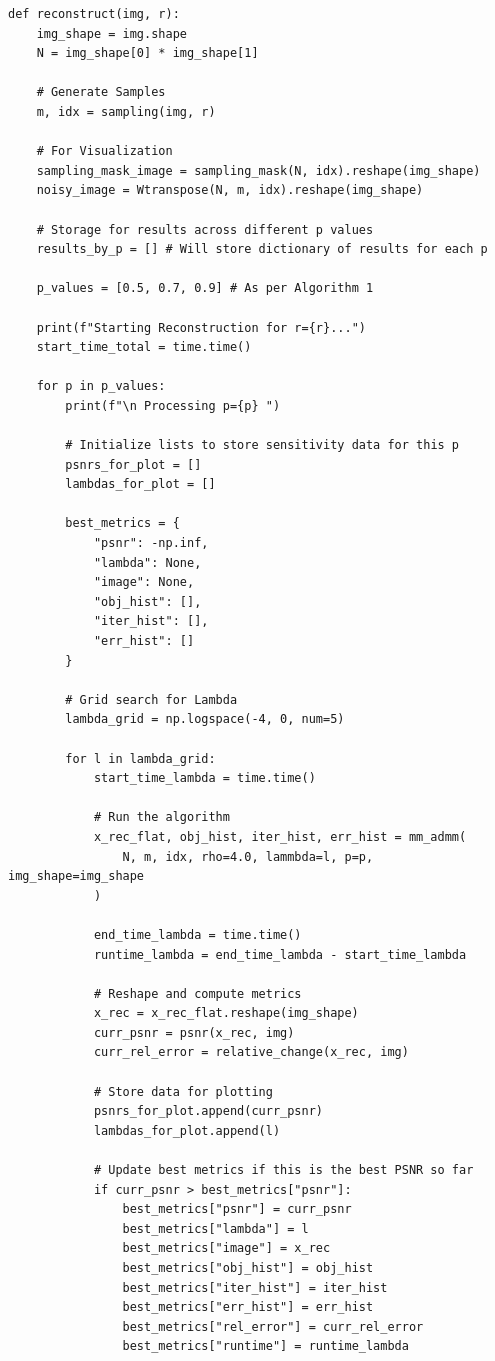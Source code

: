 \documentclass[12pt,a4paper,onecolumn]{exam}
\begin{document}
\begin{lstlisting}
def reconstruct(img, r):
    img_shape = img.shape
    N = img_shape[0] * img_shape[1] 
    
    # Generate Samples
    m, idx = sampling(img, r) 
    
    # For Visualization
    sampling_mask_image = sampling_mask(N, idx).reshape(img_shape)
    noisy_image = Wtranspose(N, m, idx).reshape(img_shape)

    # Storage for results across different p values
    results_by_p = [] # Will store dictionary of results for each p
    
    p_values = [0.5, 0.7, 0.9] # As per Algorithm 1
    
    print(f"Starting Reconstruction for r={r}...")
    start_time_total = time.time()
    
    for p in p_values:
        print(f"\n Processing p={p} ")
        
        # Initialize lists to store sensitivity data for this p
        psnrs_for_plot = []
        lambdas_for_plot = []
        
        best_metrics = {
            "psnr": -np.inf,
            "lambda": None,
            "image": None,
            "obj_hist": [],
            "iter_hist": [],
            "err_hist": []
        }
        
        # Grid search for Lambda
        lambda_grid = np.logspace(-4, 0, num=5) 
        
        for l in lambda_grid:
            start_time_lambda = time.time()
            
            # Run the algorithm
            x_rec_flat, obj_hist, iter_hist, err_hist = mm_admm(
                N, m, idx, rho=4.0, lammbda=l, p=p, img_shape=img_shape
            )
            
            end_time_lambda = time.time()
            runtime_lambda = end_time_lambda - start_time_lambda
            
            # Reshape and compute metrics
            x_rec = x_rec_flat.reshape(img_shape)
            curr_psnr = psnr(x_rec, img)
            curr_rel_error = relative_change(x_rec, img)
            
            # Store data for plotting
            psnrs_for_plot.append(curr_psnr)
            lambdas_for_plot.append(l)
            
            # Update best metrics if this is the best PSNR so far
            if curr_psnr > best_metrics["psnr"]:
                best_metrics["psnr"] = curr_psnr
                best_metrics["lambda"] = l
                best_metrics["image"] = x_rec
                best_metrics["obj_hist"] = obj_hist
                best_metrics["iter_hist"] = iter_hist
                best_metrics["err_hist"] = err_hist
                best_metrics["rel_error"] = curr_rel_error
                best_metrics["runtime"] = runtime_lambda


\end{lstlisting}
\end{document}
